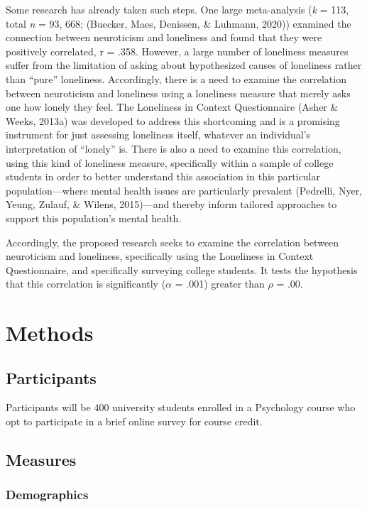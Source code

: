 \documentclass[
  english,
  man]{apa6}
\begin{document}
Some research has already taken such steps. One large meta-analysis (\emph{k} = 113, total \emph{n} = 93, 668; (Buecker, Maes, Denissen, \& Luhmann, 2020)) examined the connection between neuroticism and loneliness and found that they were positively correlated, r = .358. However, a large number of loneliness measures suffer from the limitation of asking about hypothesized causes of loneliness rather than ``pure'' loneliness. Accordingly, there is a need to examine the correlation between neuroticism and loneliness using a loneliness measure that merely asks one how lonely they feel. The Loneliness in Context Questionnaire (Asher \& Weeks, 2013a) was developed to address this shortcoming and is a promising instrument for just assessing loneliness itself, whatever an individual's interpretation of ``lonely'' is. There is also a need to examine this correlation, using this kind of loneliness measure, specifically within a sample of college students in order to better understand this association in this particular population---where mental health issues are particularly prevalent (Pedrelli, Nyer, Yeung, Zulauf, \& Wilens, 2015)---and thereby inform tailored approaches to support this population's mental health.

Accordingly, the proposed research seeks to examine the correlation between neuroticism and loneliness, specifically using the Loneliness in Context Questionnaire, and specifically surveying college students. It tests the hypothesis that this correlation is significantly (\(\alpha\) = .001) greater than \(\rho\) = .00.

\section{Methods}\label{methods}

\subsection{Participants}\label{participants}

Participants will be 400 university students enrolled in a Psychology course who opt to participate in a brief online survey for course credit.

\subsection{Measures}\label{measures}

\subsubsection{Demographics}\label{demographics}
\end{document}
